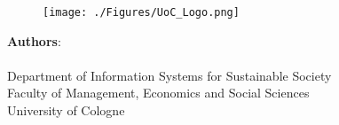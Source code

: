 \makeatletter
\begin{titlepage}
    \begin{center}
        \vspace{0.9cm}

        \Large
        \textbf{\@title}

        \vspace{0.9cm}
        
        \thesistype{}
        
        \vspace{0.9cm}

        \begin{figure}[htbp]
             \centering
             \texttt{[image: ./Figures/UoC\_Logo.png]}
        \end{figure}

        \vspace{1cm}

        \large
        \textbf{Authors}: \\
        \thesisauthor{} \\

        \vspace{1cm}
        \large
        Department of Information Systems for Sustainable Society\\
        Faculty of Management, Economics and Social Sciences\\
        University of Cologne\\

        \vspace{1cm}
        \@date

    \end{center}
\end{titlepage}
\makeatother